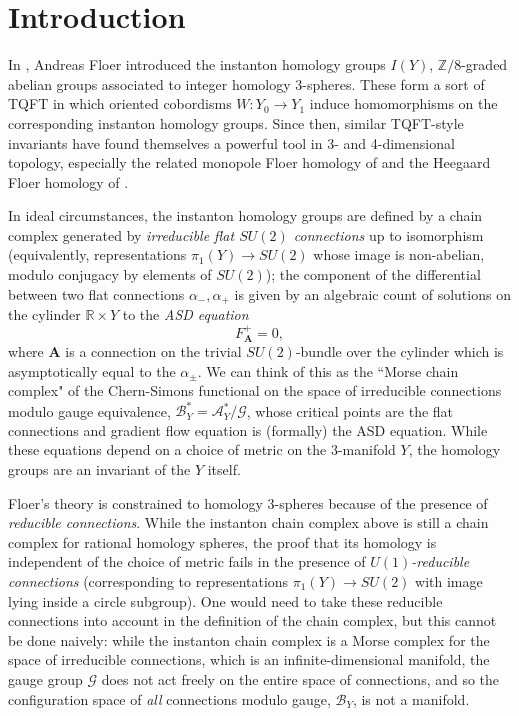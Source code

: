 \documentclass{memo-l}
\theoremstyle{definition}
\theoremstyle{remark}
\numberwithin{section}{chapter}
\numberwithin{equation}{chapter}
\begin{document}
\maketitle

\tableofcontents


\chapter{Introduction}
In \cite{Fl1}, Andreas Floer introduced the instanton homology groups $I(Y)$, $\mathbb Z/8$-graded abelian groups associated to integer homology 3-spheres. These form a sort of TQFT in which oriented cobordisms $W: Y_0 \to Y_1$ induce homomorphisms on the corresponding instanton homology groups. Since then, similar TQFT-style invariants have found themselves a powerful tool in 3- and 4-dimensional topology, especially the related monopole Floer homology of \cite{KMSW} and the Heegaard Floer homology of \cite{OS}.

In ideal circumstances, the instanton homology groups are defined by a chain complex generated by \emph{irreducible flat $SU(2)$ connections} up to isomorphism (equivalently, representations $\pi_1(Y) \to SU(2)$ whose image is non-abelian, modulo conjugacy by elements of $SU(2)$); the component of the differential between two flat connections $\alpha_-, \alpha_+$ is given by an algebraic count of solutions on the cylinder $\mathbb R \times Y$ to the \emph{ASD equation} $$F_{\mathbf{A}}^+ = 0,$$ where $\mathbf{A}$ is a connection on the trivial $SU(2)$-bundle over the cylinder which is asymptotically equal to the $\alpha_\pm$. We can think of this as the ``Morse chain complex" of the Chern-Simons functional on the space of irreducible connections modulo gauge equivalence, $\mathcal B_Y^* = \mathcal A_Y^*/\mathcal G$, whose critical points are the flat connections and gradient flow equation is (formally) the ASD equation. While these equations depend on a choice of metric on the 3-manifold $Y$, the homology groups are an invariant of the $Y$ itself.

Floer's theory is constrained to homology 3-spheres because of the presence of \emph{reducible connections}. While the instanton chain complex above is still a chain complex for rational homology spheres, the proof that its homology is independent of the choice of metric fails in the presence of \emph{$U(1)$-reducible connections} (corresponding to representations $\pi_1(Y) \to SU(2)$ with image lying inside a circle subgroup). One would need to take these reducible connections into account in the definition of the chain complex, but this cannot be done naively: while the instanton chain complex is a Morse complex for the space of irreducible connections, which is an infinite-dimensional manifold, the gauge group $\mathcal G$ does not act freely on the entire space of connections, and so the configuration space of \emph{all} connections modulo gauge, $\mathcal B_Y$, is not a manifold.
\end{document}
